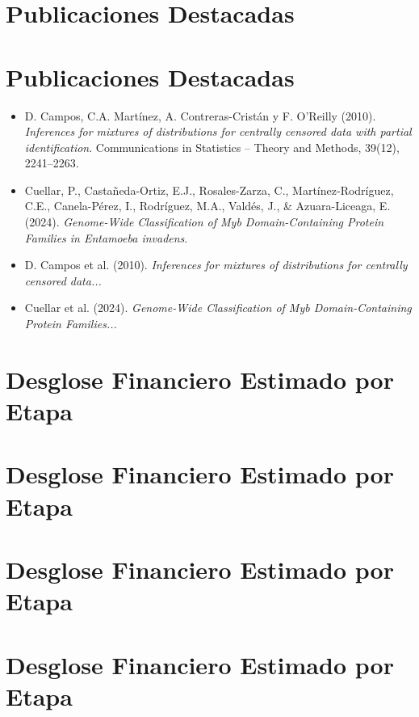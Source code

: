 \documentclass[12pt]{article}
\begin{document}
\section{Publicaciones Destacadas}
\section{Publicaciones Destacadas}
\begin{itemize}
  \item D. Campos, C.A. Martínez, A. Contreras-Cristán y F. O'Reilly (2010). \textit{Inferences for mixtures of distributions for centrally censored data with partial identification}. Communications in Statistics -- Theory and Methods, 39(12), 2241--2263.
  \item Cuellar, P., Castañeda-Ortiz, E.J., Rosales-Zarza, C., Martínez-Rodríguez, C.E., Canela-Pérez, I., Rodríguez, M.A., Valdés, J., \& Azuara-Liceaga, E. (2024). \textit{Genome-Wide Classification of Myb Domain-Containing Protein Families in Entamoeba invadens}.
\end{itemize}


\begin{itemize}
  \item D. Campos et al. (2010). \textit{Inferences for mixtures of distributions for centrally censored data...}
  \item Cuellar et al. (2024). \textit{Genome-Wide Classification of Myb Domain-Containing Protein Families...}
\end{itemize}


\section{Desglose Financiero Estimado por Etapa}

\section{Desglose Financiero Estimado por Etapa}

\section{Desglose Financiero Estimado por Etapa}

\section{Desglose Financiero Estimado por Etapa}
\end{document}
